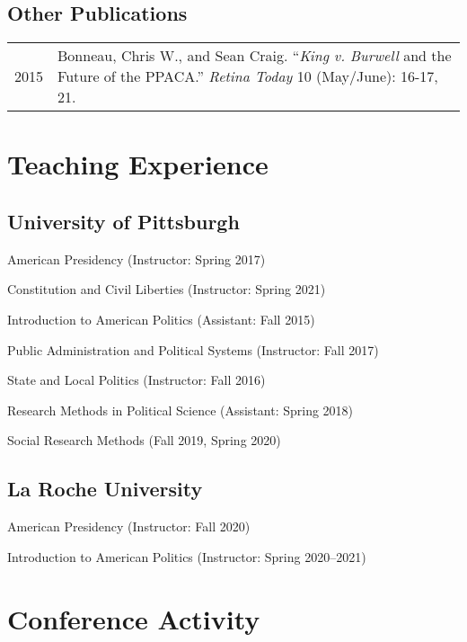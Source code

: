 \documentclass[12pt,letterpaper]{article}
\begin{document}
\subsection*{\sf Other Publications}
\begin{tabularx}{\textwidth}{@{}DX@{}}
  2015 & Bonneau, Chris W., and Sean Craig. %
    ``{\em King v. Burwell} and the Future of the PPACA.'' %
    {\em Retina Today} 10 (May/June): 16-17, 21. \bigskip \\
\end{tabularx} \par\bigskip

\section*{\sf Teaching Experience}

\subsection*{\sf University of Pittsburgh}
American Presidency (Instructor: Spring 2017) \par
Constitution and Civil Liberties (Instructor: Spring 2021) \par
Introduction to American Politics (Assistant: Fall 2015) \par
Public Administration and Political Systems (Instructor: Fall 2017) \par
State and Local Politics (Instructor: Fall 2016) \par
Research Methods in Political Science (Assistant: Spring 2018) \par
Social Research Methods (Fall 2019, Spring 2020) \par

\subsection*{\sf La Roche University}
American Presidency (Instructor: Fall 2020)\par
Introduction to American Politics (Instructor: Spring 2020--2021)

\section*{\sf Conference Activity}
\end{document}
